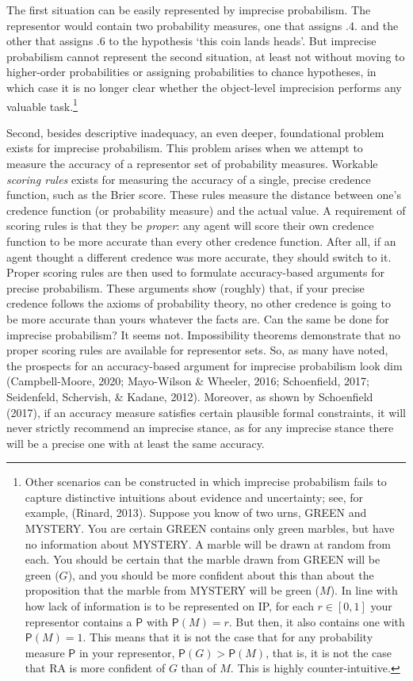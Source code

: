 \documentclass[
  10pt,
  dvipsnames,enabledeprecatedfontcommands]{scrartcl}
\newcommand{\pr}[1]{\mathsf{P}(#1)}
\begin{document}
\noindent The first situation can be easily represented by imprecise
probabilism. The representor would contain two probability measures, one
that assigns .4. and the other that assigns .6 to the hypothesis `this
coin lands heads'. But imprecise probabilism cannot represent the second
situation, at least not without moving to higher-order probabilities or
assigning probabilities to chance hypotheses, in which case it is no
longer clear whether the object-level imprecision performs any valuable
task.\footnote{Other scenarios can be constructed in which imprecise
  probabilism fails to capture distinctive intuitions about evidence and
  uncertainty; see, for example, (Rinard, 2013). Suppose you know of two
  urns, \textsf{GREEN} and \textsf{MYSTERY}. You are certain
  \textsf{GREEN} contains only green marbles, but have no information
  about \textsf{MYSTERY}. A marble will be drawn at random from each.
  You should be certain that the marble drawn from \textsf{GREEN} will
  be green (\(G\)), and you should be more confident about this than
  about the proposition that the marble from \textsf{MYSTERY} will be
  green (\(M\)). In line with how lack of information is to be
  represented on \textsf{IP}, for each \(r\in [0,1]\) your representor
  contains a \(\mathsf{P}\) with \(\pr{M}=r\). But then, it also
  contains one with \(\pr{M}=1\). This means that it is not the case
  that for any probability measure \(\mathsf{P}\) in your representor,
  \(\mathsf{P}(G) > \mathsf{P}(M)\), that is, it is not the case that RA
  is more confident of \(G\) than of \(M\). This is highly
  counter-intuitive.}

Second, besides descriptive inadequacy, an even deeper, foundational
problem exists for imprecise probabilism. This problem arises when we
attempt to measure the accuracy of a representor set of probability
measures. Workable \emph{scoring rules} exists for measuring the
accuracy of a single, precise credence function, such as the Brier
score. These rules measure the distance between one's credence function
(or probability measure) and the actual value. A requirement of scoring
rules is that they be \emph{proper}: any agent will score their own
credence function to be more accurate than every other credence
function. After all, if an agent thought a different credence was more
accurate, they should switch to it. Proper scoring rules are then used
to formulate accuracy-based arguments for precise probabilism. These
arguments show (roughly) that, if your precise credence follows the
axioms of probability theory, no other credence is going to be more
accurate than yours whatever the facts are. Can the same be done for
imprecise probabilism? It seems not. Impossibility theorems demonstrate
that no proper scoring rules are available for representor sets. So, as
many have noted, the prospects for an accuracy-based argument for
imprecise probabilism look dim (Campbell-Moore, 2020; Mayo-Wilson \&
Wheeler, 2016; Schoenfield, 2017; Seidenfeld, Schervish, \& Kadane,
2012). Moreover, as shown by Schoenfield (2017), if an accuracy measure
satisfies certain plausible formal constraints, it will never strictly
recommend an imprecise stance, as for any imprecise stance there will be
a precise one with at least the same accuracy.
\end{document}
